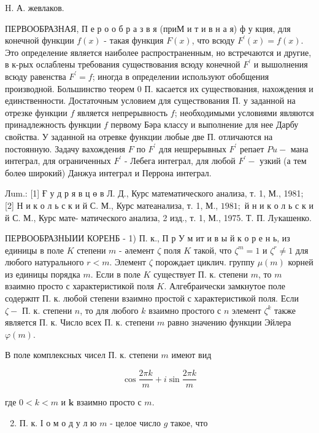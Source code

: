\documentclass[10pt]{article}
\begin{document}
H. А. жевлаков.

ПЕРВООБРАЗНАЯ, П е р о о б р а з в я (приМ и т и в н а я) ф у кция, для конечной функции $f(x)$ - такая функция $F(x)$, что всюду $F^{\prime}(x)=f(x)$. Это определение является наиболее распространенным, но встречаются и другие, в к-рых ослаблены требования сущөствования всюду конечной $F^{\prime}$ и вышолнения всюду равенства $F^{\prime}=f$; иногда в определении используют обобщения производной. Большинство теорем 0 П. касается их существования, нахождения и единственности. Достаточным условием для существования П. у заданной на отрезке функции $f$ является непрерывность $f$; необходимыми условиями являются принадлежность функции $f$ первому Бәра классу и выполнение для нее Дарбу свойства. У заданной на отревке функции любые две П. отличаются на постоянную. Задачу вахождения $F$ по $F^{\prime}$ для нешрерывных $F^{\prime}$ репает $P u-$ мана интеграл, для ограниченных $F^{\prime}$ - Лебега интеграл, для любой $F^{\prime}-$ узкий (а тем болеө широкий) Данжуа интеграл и Перрона интеграл.

Лum.: [1] Ғ у д р я в ц ө в Л. Д., Курс математического анализа, т. 1, М., 1981; [2] Н и к о л ь с к и й С. М., Курс матеанализа, т. 1, М., $1981 ;$ й н и к о л ь с к и й С. М., Курс мате-
матического анализа, 2 изд., т. 1, М., 1975. Т. П. Лyкашенко.

ПЕРВООБРАЗНЫИИ КОРЕНБ - 1) П. к., П р У м ит и в ы й к о р е н ь, из единицы в поле $K$ степени $m$ - әлемент $\zeta$ поля $K$ такой, что $\zeta^{m}=1$ и $\zeta^{r} \neq 1$ для любого натурального $r<m$. Элемент $\zeta$ порождает циклич. группу $\mu(m)$ корней из единицы порядка $m$. Если в поле $K$ существует П. к. степени $m$, то $m$ взаимно просто с характеристикой поля $K$. Алгебраически замкнутое поле содержпт П. к. любой степени взаимно простой с характеристикой поля. Если $\zeta-$ П. к. степени $n$, то для любого $k$ взаимно простого с $n$ элемент $\zeta^{k}$ также является П. к. Число всех П. к. степени $m$ равно значению функции Эйлера $\varphi(m)$.

В поле комплексных чисел П. к. степени $m$ имеют вид

\[
\cos \frac{2 \pi k}{m}+i \sin \frac{2 \pi k}{m}
\]

где $0<k<m$ и $\boldsymbol{k}$ взаимно просто с $m$.

\begin{enumerate}
  \setcounter{enumi}{1}
  \item П. к. І о м о д у л ю $m$ - целое число $g$ такое, что
\end{enumerate}
\end{document}
